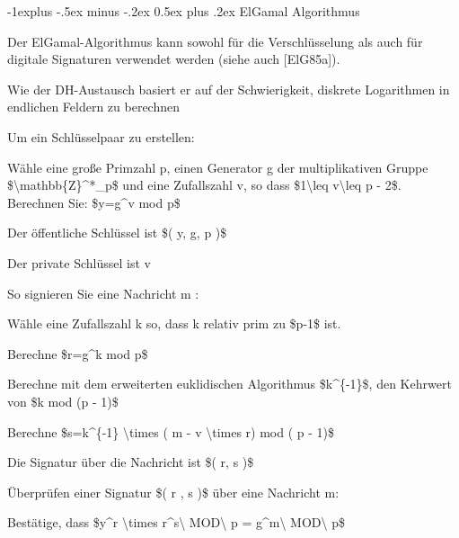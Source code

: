 \documentclass[a4paper]{article}
\makeatletter
\renewcommand{\subsection}{\@startsection{subsection}{2}{0mm}%
 {-1explus -.5ex minus -.2ex}%
 {0.5ex plus .2ex}%
 {\normalfont\normalsize\bfseries}}
\makeatother
\begin{document}
\begin{multicols}{3}
      \subsection{ElGamal Algorithmus}

      \begin{itemize*}
            \item Der ElGamal-Algorithmus kann sowohl für die Verschlüsselung als auch
            für digitale Signaturen verwendet werden (siehe auch {[}ElG85a{]}).
            \item Wie der DH-Austausch basiert er auf der Schwierigkeit, diskrete
            Logarithmen in endlichen Feldern zu berechnen
            \item Um ein Schlüsselpaar zu erstellen:
            \begin{itemize*}
                  \item Wähle eine große Primzahl p, einen Generator g der multiplikativen Gruppe \$\textbackslash mathbb\{Z\}\^{}*\_p\$ und eine Zufallszahl v, so dass \$1\textbackslash leq v\textbackslash leq p - 2\$. Berechnen Sie: \$y=g\^{}v mod p\$
                  \item Der öffentliche Schlüssel ist \$( y, g, p )\$
                  \item Der private Schlüssel ist v
            \end{itemize*}
            \item So signieren Sie eine Nachricht m :
            \begin{itemize*}
                  \item Wähle eine Zufallszahl k so, dass k relativ prim zu \$p-1\$ ist.
                  \item Berechne \$r=g\^{}k mod p\$
                  \item Berechne mit dem erweiterten euklidischen Algorithmus \$k\^{}\{-1\}\$, den Kehrwert von \$k mod (p - 1)\$
                  \item Berechne \$s=k\^{}\{-1\} \textbackslash times ( m - v \textbackslash times r) mod ( p - 1)\$
                  \item Die Signatur über die Nachricht ist \$( r, s )\$
            \end{itemize*}
            \item Überprüfen einer Signatur \$( r , s )\$ über eine Nachricht m:
            \begin{itemize*}
                  \item Bestätige, dass \$y\^{}r \textbackslash times r\^{}s\textbackslash{} MOD\textbackslash{} p = g\^{}m\textbackslash{} MOD\textbackslash{} p\$

\end{itemize*}
\end{itemize*}
\end{multicols}
\end{document}

